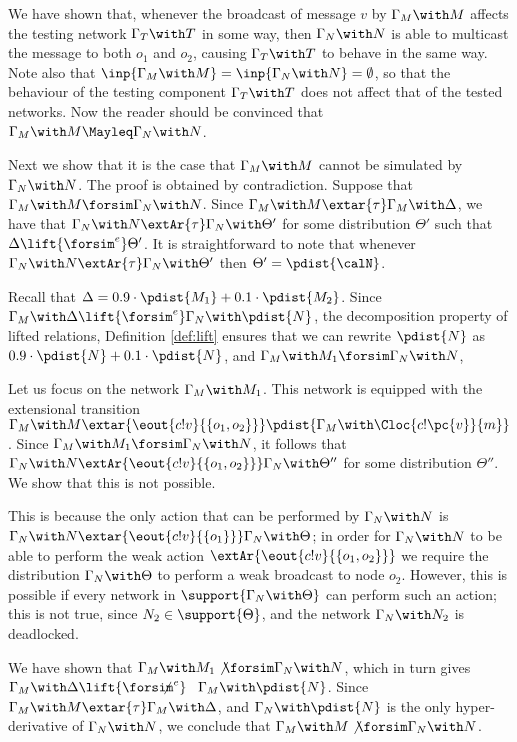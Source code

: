 \documentclass{LMCS}
\begin{document}
\begin{exa}
  \noindent We have shown that, whenever the broadcast of message
  $v$ by $\Gamma_M \with M$ affects the testing network $\Gamma_T
  \with T$ in some way, then $\Gamma_N \with N$ is able to
  multicast the message to both $o_1$ and $o_2$, causing $\Gamma_T
  \with T$ to behave in the same way. Note also that 
  $\inp{\Gamma_M \with M} = \inp{\Gamma_N \with N} = \emptyset$, 
  so that the behaviour of the testing component $\Gamma_T \with T$ 
  does not affect that of the tested networks. 
  Now the reader should 
  be convinced that $\Gamma_M \with M 
  \Mayleq \Gamma_N \with N$.
  
  Next we show that it is the case that $\Gamma_M \with M$ cannot
  be simulated by $\Gamma_N \with N$. The proof is obtained by
  contradiction. Suppose that $\Gamma_M \with M
  \forsim \Gamma_N \with N$. 
  Since $\Gamma_M \with M \extar{\tau} \Gamma_M \with \Delta$, 
  we have that $\Gamma_N \with N \extAr{\tau} \Gamma_N \with \Theta'$ 
  for some distribution $\Theta'$ such that $\Delta \lift{\forsim^e} \Theta'$. 
  It is straightforward to note that whenever $\Gamma_N \with N 
  \extAr{\tau} \Gamma_N \with \Theta'$ then $\Theta' = \pdist{\calN}$. 
  
  Recall that $\Delta = 0.9 \cdot \pdist{M_1} + 0.1 \cdot \pdist{M_2}$. 
  Since $\Gamma_M \with \Delta \lift{\forsim^e} \Gamma_N \with \pdist{N}$, 
  the decomposition property of lifted relations, 
  Definition \ref{def:lift} ensures that we can rewrite 
  $\pdist{N}$ as $0.9 \cdot \pdist{N} + 0.1 \cdot{\pdist{N}}$, 
  and $\Gamma_M \with M_1 \forsim \Gamma_N \with N$, 
  
  Let us focus on the network $\Gamma_M \with M_1$. 
  This network is equipped with the extensional transition 
  $\Gamma_M \with M \extar{\eout{c!v}{\{o_1,o_2\}}} \pdist{\Gamma_M \with \Cloc{c!\pc{v}}{m}}$. 
  Since $\Gamma_M \with M_1 \forsim \Gamma_N \with N$, it follows that 
  $\Gamma_N \with N \extAr{\eout{c!v}{\{o_1,o_2\}}} \Gamma_N \with \Theta''$ 
  for some distribution $\Theta''$. We show that this is not possible. 
  
  This is because the only action that can be performed by 
  $\Gamma_N \with N$ is $\Gamma_N \with N \extar{\eout{c!v}{\{o_1\}}} 
  \Gamma_N \with \Theta$; in order for $\Gamma_N \with N$ to be 
  able to perform the weak action $\extAr{\eout{c!v}{\{o_1,o_2\}}}$ 
  we require the distribution $\Gamma_N \with \Theta$ 
  to perform a weak broadcast to node $o_2$. 
  However, this is possible if every network in $\support{\Gamma_N \with 
  \Theta}$ can perform such an action; this is not true, since 
  $N_2 \in \support{\Theta}$, and the network $\Gamma_N \with N_2$ 
  is deadlocked. 
  
  We have shown that $\Gamma_M \with M_1 \not\forsim \Gamma_N \with N$, 
  which in turn gives $\Gamma_M \with \Delta \lift{\forsim^e}\hspace{-20pt}\not\;\hspace{20pt}
  \Gamma_M \with \pdist{N}$. Since $\Gamma_M \with M \extar{\tau} 
  \Gamma_M \with \Delta$, and $\Gamma_N \with \pdist{N}$ is 
  the only hyper-derivative of $\Gamma_N \with N$, we conclude 
  that $\Gamma_M \with M \not\forsim \Gamma_N \with N$. 
  \end{exa}
  
\end{document}
